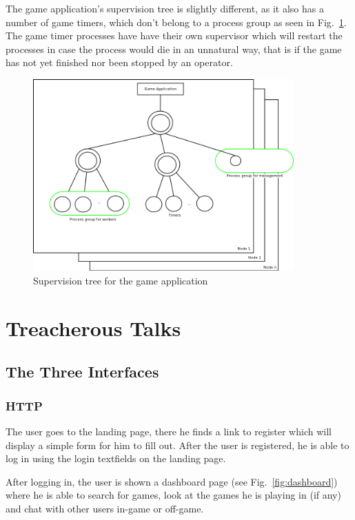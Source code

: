 \documentclass[11pt,a4paper]{report}
\begin{document}
The game application's supervision tree is slightly different, as it also has a
number of game timers, which don't belong to a process group as seen in
Fig.~\ref{fig:game_app}. The game timer processes have have their own supervisor
which will restart the processes in case the process would die in an unnatural
way, that is if the game has not yet finished nor been stopped by an operator.
\begin{figure}[h]
 \centering
 \includegraphics[width=10cm]{./graphics/game_Application.png}
 \caption{Supervision tree for the game application}
 \label{fig:game_app}
\end{figure}

\chapter{Treacherous Talks}
\section{The Three Interfaces}
\subsection{HTTP}
The user goes to the landing page, there he finds a link to register which will
display a simple form for him to fill out. After the user is registered, he is
able to log in using the login textfields on the landing page.

After logging in, the user is shown a dashboard page (see Fig.~\ref{fig:dashboard})
 where he is able to search for games, look at the games he is playing in (if any) and
chat with other users in-game or off-game.
\end{document}
